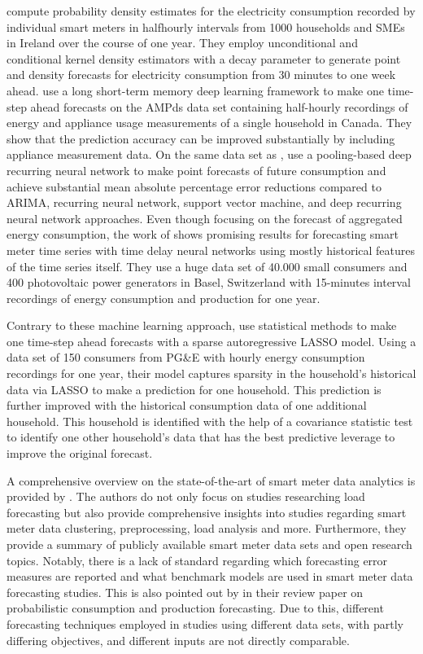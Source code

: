 \citet{Arora:2016} compute probability density estimates for the electricity consumption recorded by individual smart meters in halfhourly intervals from 1000 households and SMEs in Ireland over the course of one year. They employ unconditional and conditional kernel density estimators with a decay parameter to generate point and density forecasts for electricity consumption from 30 minutes to one week ahead. \citet{Kong:2018} use a long short-term memory deep learning framework to make one time-step ahead forecasts on the AMPds data set containing half-hourly recordings of energy and appliance usage measurements of a single household in Canada. They show that the prediction accuracy can be improved substantially by including appliance measurement data. On the same data set as \citet{Arora:2016}, \citet{Shi:2017} use a pooling-based deep recurring neural network to make point forecasts of future consumption and achieve substantial mean absolute percentage error reductions compared to ARIMA, recurring neural network, support vector machine, and deep recurring neural network approaches. Even though focusing on the forecast of aggregated energy consumption, the work of \citet{Zufferey:2017} shows promising results for forecasting smart meter time series with time delay neural networks using mostly historical features of the time series itself. They use a huge data set of 40.000 small consumers and 400 photovoltaic power generators in Basel, Switzerland with 15-minutes interval recordings of energy consumption and production for one year.

Contrary to these machine learning approach, \citet{Li:2017} use statistical methods to make one time-step ahead forecasts with a sparse autoregressive LASSO model. Using a data set of 150 consumers from PG\&E with hourly energy consumption recordings for one year, their model captures sparsity in the household’s historical data via LASSO to make a prediction for one household. This prediction is further improved with the historical consumption data of one additional household. This household is identified with the help of a covariance statistic test to identify one other household's data that has the best predictive leverage to improve the original forecast.

A comprehensive overview on the state-of-the-art of smart meter data analytics is provided by \citet{Wang:2018}. The authors do not only focus on studies researching load forecasting but also provide comprehensive insights into studies regarding smart meter data clustering, preprocessing, load analysis and more. Furthermore, they provide a summary of publicly available smart meter data sets and open research topics. Notably, there is a lack of standard regarding which forecasting error measures are reported and what benchmark models are used in smart meter data forecasting studies. This is also pointed out by \citet{Meer:2018} in their review paper on probabilistic consumption and production forecasting. Due to this, different forecasting techniques employed in studies using different data sets, with partly differing objectives, and different inputs are not directly comparable. 



